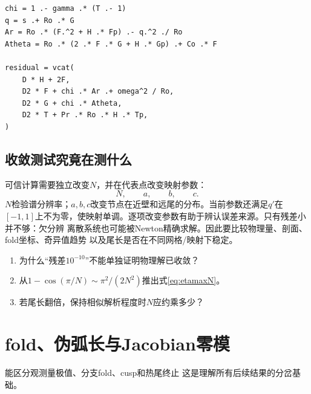 \documentclass[UTF8,zihao=-4,openany]{ctexbook}
\begin{document}
\begin{lstlisting}[caption={一致模型残差的核心结构（概念性摘录）}]
chi = 1 .- gamma .* (T .- 1)
q = s .+ Ro .* G
Ar = Ro .* (F.^2 + H .* Fp) .- q.^2 ./ Ro
Atheta = Ro .* (2 .* F .* G + H .* Gp) .+ Co .* F

residual = vcat(
    D * H + 2F,
    D2 * F + chi .* Ar .+ omega^2 / Ro,
    D2 * G + chi .* Atheta,
    D2 * T + Pr .* Ro .* H .* Tp,
)
\end{lstlisting}

\section{收敛测试究竟在测什么}

可信计算需要独立改变$N$，并在代表点改变映射参数：
\begin{equation}
 N,\qquad a,\qquad b,\qquad c.
\end{equation}
$N$检验谱分辨率；$a,b,c$改变节点在近壁和远尾的分布。当前参数还满足$q'$在
$[-1,1]$上不为零，使映射单调。逐项改变参数有助于辨认误差来源。只有残差小并不够：欠分辨
离散系统也可能被Newton精确求解。因此要比较物理量、剖面、fold坐标、奇异值趋势
以及尾长是否在不同网格/映射下稳定。

\enlargethispage{7\baselineskip}
\begin{checkpoint}
\begin{enumerate}
  \item 为什么“残差$10^{-10}$”不能单独证明物理解已收敛？
  \item 从$1-\cos(\pi/N)\sim\pi^2/(2N^2)$推出式\eqref{eq:etamaxN}。
  \item 若尾长翻倍，保持相似解析程度时$N$应约乘多少？
\end{enumerate}
\end{checkpoint}

\chapter{fold、伪弧长与Jacobian零模}

\begin{learninggoal}{能区分观测量极值、分支fold、cusp和热尾终止}
这是理解所有后续结果的分岔基础。
\end{learninggoal}
\end{document}
